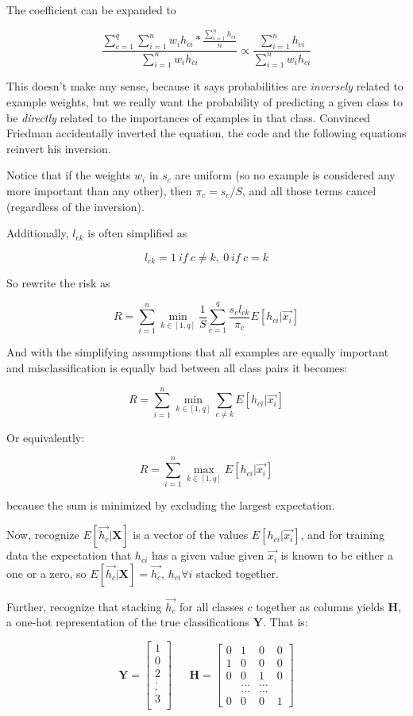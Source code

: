 \documentclass[12pt]{article}
\begin{document}
The coefficient can be expanded to

$$\frac{\sum_{c=1}^q \sum_{i=1}^n w_i h_{ci} * \frac{\sum_{i=1}^n h_{ci}}{n}}{\sum_{i=1}^n w_i h_{ci}} \propto \frac{\sum_{i=1}^n h_{ci}}{\sum_{i=1}^n w_i h_{ci}}$$

This doesn't make any sense, because it says probabilities are \textit{inversely} related to example weights, but we really want the probability of predicting a given class to be \textit{directly} related to the importances of examples in that class. Convinced Friedman accidentally inverted the equation, the code and the following equations reinvert his inversion.

Notice that if the weights $w_i$ in $s_c$ are uniform (so no example is considered any more important than any other), then $\pi_c = s_c/S$, and all those terms cancel (regardless of the inversion).

Additionally, $l_{ck}$ is often simplified as

$$l_{ck} = 1\ if\ c \neq k,\ 0\ if\ c=k$$

So rewrite the risk as

$$R = \sum_{i=1}^n \min_{k \in [1,q]} \frac{1}{S} \sum_{c=1}^q \frac{s_c l_{ck}}{\pi_c} E[h_{ci} | \vec{x_i}]$$

And with the simplifying assumptions that all examples are equally important and misclassification is equally bad between all class pairs it becomes:

$$R = \sum_{i=1}^n \min_{k \in [1,q]} \sum_{c \neq k} E[h_{ci} | \vec{x_i}]$$

Or equivalently:

$$R = \sum_{i=1}^n \max_{k \in [1,q]} E[h_{ci} | \vec{x_i}]$$

because the sum is minimized by excluding the largest expectation.\newline

Now, recognize $E[\vec{h_c} | \pmb{X}]$ is a vector of the values $E[h_{ci} | \vec{x_i}]$, and for training data the expectation that $h_{ci}$ has a given value given $\vec{x_i}$ is known to be either a one or a zero, so $E[\vec{h_c} | \pmb{X}] = \vec{h_c}$, $h_{ci} \forall i$ stacked together.

Further, recognize that stacking $\vec{h_c}$ for all classes $c$ together as columns yields $\pmb{H}$, a one-hot representation of the true classifications $\pmb{Y}$. That is:

\[
\pmb{Y} =
\begin{bmatrix}
1\\
0\\
2\\
.\\
.\\
3\\
\end{bmatrix}
\ \ \ \ \ \ \ \pmb{H} =
\begin{bmatrix}
0 & 1 & 0 & 0\\
1 & 0 & 0 & 0\\
0 & 0 & 1 & 0\\
& \hdots & \hdots\\
& \hdots & \hdots\\
0 & 0 & 0 & 1
\end{bmatrix}
\]
\end{document}

